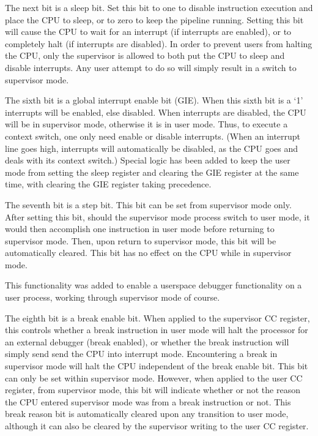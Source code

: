 \documentclass{gqtekspec}
\begin{document}
The next bit is a sleep bit.  Set this bit to one to disable instruction
	execution and place the CPU to sleep, or to zero to keep the pipeline
	running.  Setting this bit will cause the CPU to wait for an interrupt
	(if interrupts are enabled), or to completely halt (if interrupts are
	disabled).  In order to prevent users from halting the CPU, only the
	supervisor is allowed to both put the CPU to sleep and disable
	interrupts.  Any user attempt to do so will simply result in a switch
	to supervisor mode.

The sixth bit is a global interrupt enable bit (GIE).  When this
	sixth bit is a `1' interrupts will be enabled, else disabled.  When 
	interrupts are disabled, the CPU will be in supervisor mode, otherwise
	it is in user mode.  Thus, to execute a context switch, one only
	need enable or disable interrupts.  (When an interrupt line goes
	high, interrupts will automatically be disabled, as the CPU goes
	and deals with its context switch.)  Special logic has been added to
	keep the user mode from setting the sleep register and clearing the
	GIE register at the same time, with clearing the GIE register taking
	precedence.

The seventh bit is a step bit.  This bit can be set from supervisor mode only.
	After setting this bit, should the supervisor mode process switch to
	user mode, it would then accomplish one instruction in user mode
	before returning to supervisor mode.  Then, upon return to supervisor
	mode, this bit will be automatically cleared.  This bit has no effect
	on the CPU while in supervisor mode.

	This functionality was added to enable a userspace debugger
	functionality on a user process, working through supervisor mode
	of course.


The eighth bit is a break enable bit.  When applied to the supervisor CC
register, this controls whether a break instruction in user mode will halt
the processor for an external debugger (break enabled), or whether the break
instruction will simply send send the CPU into interrupt mode.  Encountering
a break in supervisor mode will halt the CPU independent of the break enable
bit.  This bit can only be set within supervisor mode.  However, when applied
to the user CC register, from supervisor mode, this bit will indicate whether
or not the reason the CPU entered supervisor mode was from a break instruction
or not.  This break reason bit is automatically cleared upon any transition to
user mode, although it can also be cleared by the supervisor writing to the
user CC register.
\end{document}

